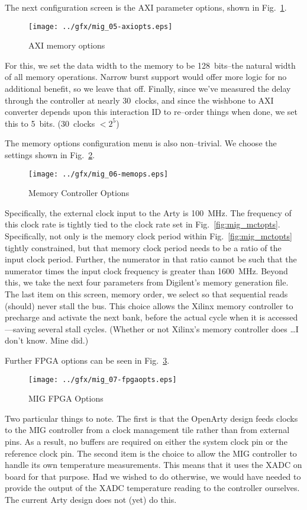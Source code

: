 \documentclass{gqtekspec}
\begin{document}
The next configuration screen is the AXI parameter options, shown in
Fig.~\ref{fig:mig_axiopts}. 
\begin{figure}\begin{center}
\texttt{[image: ../gfx/mig\_05-axiopts.eps]}
\caption{AXI memory options}\label{fig:mig_axiopts}
\end{center}\end{figure}
For this, we set the data width to the memory to
be 128~bits--the natural width of all memory operations.  Narrow burst support
would offer more logic for no additional benefit, so we leave that off. 
Finally, since we've measured
the delay through the controller at nearly 30~clocks, and since the wishbone
to AXI converter depends upon this interaction ID to re--order things when
done, we set this to 5~bits.  (30~clocks $< 2^5$)

The memory options configuration menu is also non--trivial.  We choose the
settings shown in Fig.~\ref{fig:mig_memops}. 
\begin{figure}\begin{center}
\texttt{[image: ../gfx/mig\_06-memops.eps]}
\caption{Memory Controller Options}\label{fig:mig_memops}
\end{center}\end{figure}
Specifically, the external clock input to the Arty is 100~MHz.  The frequency
of this clock rate is tightly tied to the clock rate set in
Fig.~\ref{fig:mig_mctopts}.  Specifically, not only is the memory clock period
within Fig.~\ref{fig:mig_mctopts} tightly constrained, but that memory clock
period needs to be a ratio of the input clock period.  Further, the numerator
in that ratio cannot be such that the numerator times the input clock frequency
is greater than 1600~MHz.  Beyond this, we take the next four parameters from
Digilent's memory generation file.  The last item on this screen, memory order,
we select so that sequential reads (should) never stall the bus.  This choice
allows the Xilinx memory controller to precharge and activate the next bank,
before the actual cycle when it is accessed---saving several stall cycles.
(Whether or not Xilinx's memory controller does \ldots I don't know.  Mine did.)

Further FPGA options can be seen in Fig.~\ref{fig:mig_fpgaopts}.
\begin{figure}\begin{center}
\texttt{[image: ../gfx/mig\_07-fpgaopts.eps]}
\caption{MIG FPGA Options}\label{fig:mig_fpgaopts}
\end{center}\end{figure}
Two particular things to note.  The first is that the OpenArty design feeds
clocks to the MIG controller from a clock management tile rather than from
external pins.  As a result, no buffers are required on either the system clock
pin or the reference clock pin.  The second item is the choice to allow the MIG
controller to handle its own temperature measurements.  This means that it uses
the XADC on board for that purpose.  Had we wished to do otherwise, we would
have needed to provide the output of the XADC temperature reading to the
controller ourselves.  The current Arty design does not (yet) do this.
\end{document}
